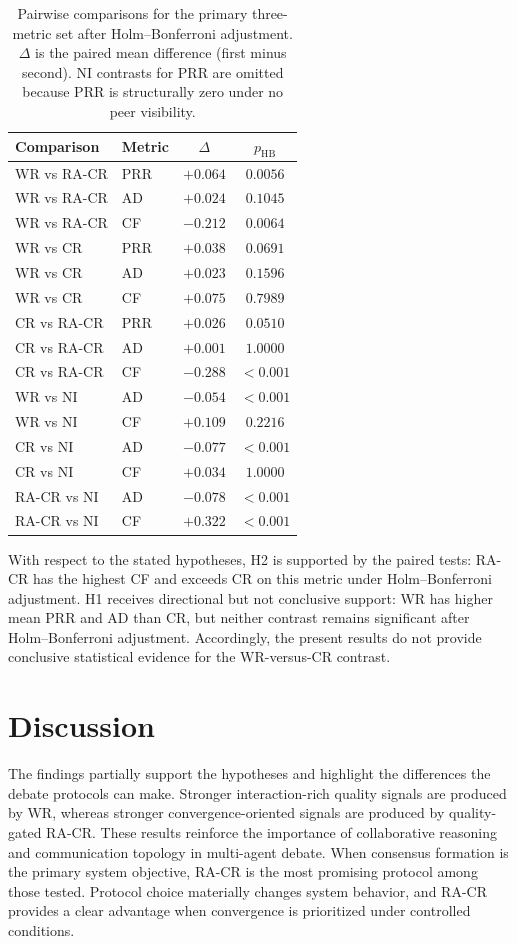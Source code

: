 \documentclass[11pt]{article}
\begin{document}
\begin{table}[H]
\centering
\caption{Pairwise comparisons for the primary three-metric set after Holm--Bonferroni adjustment. $\Delta$ is the paired mean difference (first minus second). NI contrasts for PRR are omitted because PRR is structurally zero under no peer visibility.}
\label{tab:tests}
\begin{tabular}{llcc}
\toprule
Comparison & Metric & $\Delta$ & $p_{\mathrm{HB}}$ \\
\midrule
WR vs RA-CR & PRR & $+0.064$ & $0.0056$ \\
WR vs RA-CR & AD & $+0.024$ & $0.1045$ \\
WR vs RA-CR & CF & $-0.212$ & $0.0064$ \\
\midrule
WR vs CR & PRR & $+0.038$ & $0.0691$ \\
WR vs CR & AD & $+0.023$ & $0.1596$ \\
WR vs CR & CF & $+0.075$ & $0.7989$ \\
\midrule
CR vs RA-CR & PRR & $+0.026$ & $0.0510$ \\
CR vs RA-CR & AD & $+0.001$ & $1.0000$ \\
CR vs RA-CR & CF & $-0.288$ & $<0.001$ \\
\midrule
WR vs NI & AD & $-0.054$ & $<0.001$ \\
WR vs NI & CF & $+0.109$ & $0.2216$ \\
\midrule
CR vs NI & AD & $-0.077$ & $<0.001$ \\
CR vs NI & CF & $+0.034$ & $1.0000$ \\
\midrule
RA-CR vs NI & AD & $-0.078$ & $<0.001$ \\
RA-CR vs NI & CF & $+0.322$ & $<0.001$ \\
\bottomrule
\end{tabular}
\end{table}

With respect to the stated hypotheses, H2 is supported by the paired tests: RA-CR has the highest CF and exceeds CR on this metric under Holm--Bonferroni adjustment. H1 receives directional but not conclusive support: WR has higher mean PRR and AD than CR, but neither contrast remains significant after Holm--Bonferroni adjustment. Accordingly, the present results do not provide conclusive statistical evidence for the WR-versus-CR contrast.

\section{Discussion}
The findings partially support the hypotheses and highlight the differences the debate protocols can make. Stronger interaction-rich quality signals are produced by WR, whereas stronger convergence-oriented signals are produced by quality-gated RA-CR. These results reinforce the importance of collaborative reasoning and communication topology in multi-agent debate. When consensus formation is the primary system objective, RA-CR is the most promising protocol among those tested. Protocol choice materially changes system behavior, and RA-CR provides a clear advantage when convergence is prioritized under controlled conditions.
\end{document}
